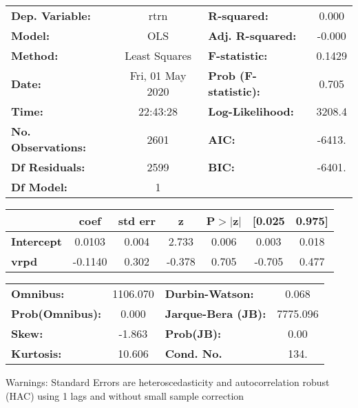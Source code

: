 \begin{center}
\begin{tabular}{lclc}
\toprule
\textbf{Dep. Variable:}    &       rtrn       & \textbf{  R-squared:         } &     0.000   \\
\textbf{Model:}            &       OLS        & \textbf{  Adj. R-squared:    } &    -0.000   \\
\textbf{Method:}           &  Least Squares   & \textbf{  F-statistic:       } &    0.1429   \\
\textbf{Date:}             & Fri, 01 May 2020 & \textbf{  Prob (F-statistic):} &    0.705    \\
\textbf{Time:}             &     22:43:28     & \textbf{  Log-Likelihood:    } &    3208.4   \\
\textbf{No. Observations:} &        2601      & \textbf{  AIC:               } &    -6413.   \\
\textbf{Df Residuals:}     &        2599      & \textbf{  BIC:               } &    -6401.   \\
\textbf{Df Model:}         &           1      & \textbf{                     } &             \\
\bottomrule
\end{tabular}
\begin{tabular}{lcccccc}
                   & \textbf{coef} & \textbf{std err} & \textbf{z} & \textbf{P$> |$z$|$} & \textbf{[0.025} & \textbf{0.975]}  \\
\midrule
\textbf{Intercept} &       0.0103  &        0.004     &     2.733  &         0.006        &        0.003    &        0.018     \\
\textbf{vrpd}      &      -0.1140  &        0.302     &    -0.378  &         0.705        &       -0.705    &        0.477     \\
\bottomrule
\end{tabular}
\begin{tabular}{lclc}
\textbf{Omnibus:}       & 1106.070 & \textbf{  Durbin-Watson:     } &    0.068  \\
\textbf{Prob(Omnibus):} &   0.000  & \textbf{  Jarque-Bera (JB):  } & 7775.096  \\
\textbf{Skew:}          &  -1.863  & \textbf{  Prob(JB):          } &     0.00  \\
\textbf{Kurtosis:}      &  10.606  & \textbf{  Cond. No.          } &     134.  \\
\bottomrule
\end{tabular}
\end{center}

Warnings: \newline
 [1] Standard Errors are heteroscedasticity and autocorrelation robust (HAC) using 1 lags and without small sample correction